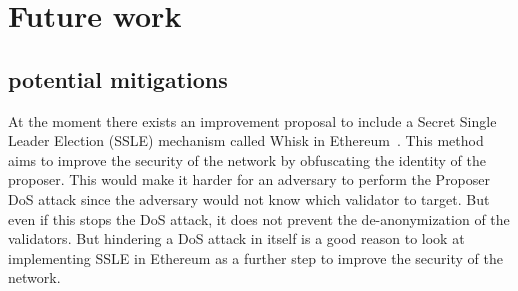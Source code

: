 

\section{Future work}\label{sec:future-works}

\subsection{potential mitigations}\label{subsec:potential-mitigations}
At the moment there exists an improvement proposal to include a Secret Single Leader Election (SSLE) mechanism called Whisk in Ethereum~\cite{EthereumResearchSSLE2024}.
This method aims to improve the security of the network by obfuscating the identity of the proposer.
This would make it harder for an adversary to perform the Proposer DoS attack since the adversary would not know which validator to target.
But even if this stops the DoS attack, it does not prevent the de-anonymization of the validators.
But hindering a DoS attack in itself is a good reason to look at implementing SSLE in Ethereum as a further step to improve the security of the network.
